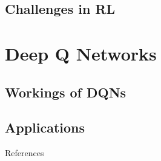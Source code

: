 \documentclass[xcolor=dvipsnames]{beamer}
\begin{document}
\subsection{Challenges in RL}

\section{Deep Q Networks}
\subsection{Workings of DQNs}
\subsection{Applications}

\begin{frame}[allowframebreaks]{References}


\end{frame}
\end{document}
